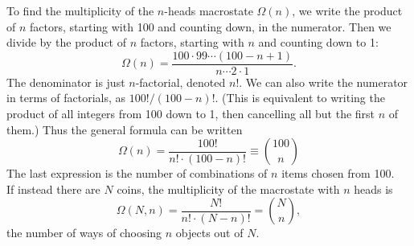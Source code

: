 \documentclass[11pt]{exam}
\begin{document}
\hspace*{10mm}To find the multiplicity of the $n$-heads macrostate $\Omega(n)$, we write the product of $n$ factors, starting with 100 and counting down, in the numerator. Then we divide by the product of $n$ factors, starting with $n$ and counting down to 1:
\begin{equation}\tag{2.4}
\Omega(n) = \frac{100\cdot 99\cdots(100-n+1)}{n\cdots 2\cdot1}.   
\end{equation}
The denominator is just $n$-factorial, denoted $n!$. We can also write the numerator in terms of factorials, as $100!/(100-n)!$. (This is equivalent to writing the product of all integers from 100 down to 1, then cancelling all but the first $n$ of them.) Thus the general formula can be written
\begin{equation}\tag{2.5}
\Omega(n) = \frac{100!}{n!\cdot(100-n)!}\equiv \binom{100}{n}    
\end{equation}
The last expression is the number of combinations of $n$ items chosen from 100. \\
\hspace*{10mm}If instead there are $N$ coins, the multiplicity of the macrostate with $n$ heads is
\begin{equation}\tag{2.6}
\Omega(N, n)=\frac{N!}{n!\cdot(N-n)!}=\binom{N}{n},    
\end{equation}
the number of ways of choosing $n$ objects out of $N$.
\newpage
\end{document}
